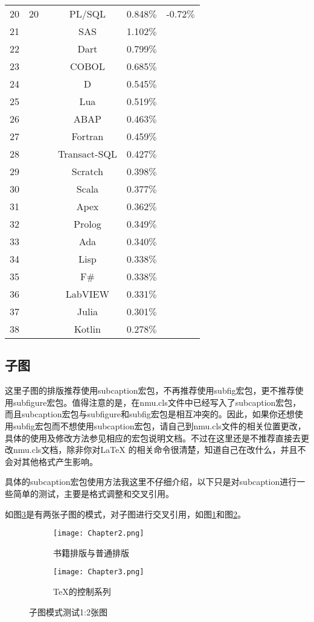 \begin{longtabu}{cccccc}
	20	&	20	&		&	PL/SQL	&	0.848$\%$	&	-0.72$\%$	\\
	21	&		&		&	SAS	&	1.102$\%$	&		\\
	22	&		&		&	Dart	&	0.799$\%$	&		\\
	23	&		&		&	COBOL	&	0.685$\%$	&		\\
	24	&		&		&	D	&	0.545$\%$	&		\\
	25	&		&		&	Lua	&	0.519$\%$	&		\\
	26	&		&		&	ABAP	&	0.463$\%$	&		\\
	27	&		&		&	Fortran	&	0.459$\%$	&		\\
	28	&		&		&	Transact-SQL	&	0.427$\%$	&		\\
	29	&		&		&	Scratch	&	0.398$\%$	&		\\
	30	&		&		&	Scala	&	0.377$\%$	&		\\
	31	&		&		&	Apex	&	0.362$\%$	&		\\
	32	&		&		&	Prolog	&	0.349$\%$	&		\\
	33	&		&		&	Ada	&	0.340$\%$	&		\\
	34	&		&		&	Lisp	&	0.338$\%$	&		\\
	35	&		&		&	F$\#$	&	0.338$\%$	&		\\
	36	&		&		&	LabVIEW	&	0.331$\%$	&		\\
	37	&		&		&	Julia	&	0.301$\%$	&		\\
	38	&		&		&	Kotlin	&	0.278$\%$	&		\\	
\end{longtabu}%

\subsection{子图}
这里子图的排版推荐使用subcaption宏包，不再推荐使用subfig宏包，更不推荐使用subfigure宏包。值得注意的是，在nmu.cls文件中已经写入了subcaption宏包，而且subcaption宏包与subfigure和subfig宏包是相互冲突的。因此，如果你还想使用subfig宏包而不想使用subcaption宏包，请自己到nmu.cls文件的相关位置更改，具体的使用及修改方法参见相应的宏包说明文档。不过在这里还是不推荐直接去更改nmu.cls文档，除非你对\LaTeX{} 的相关命令很清楚，知道自己在改什么，并且不会对其他格式产生影响。

具体的subcaption宏包使用方法我这里不仔细介绍，以下只是对subcaption进行一些简单的测试，主要是格式调整和交叉引用。

如图\ref{fig:subfig_test1}是有两张子图的模式，对子图进行交叉引用，如图\ref{subfig:1a}和图\ref{subfig:1b}。

\begin{figure}[htbp]
	\centering
	\begin{subfigure}[b]{.4\textwidth}
		\centering
		\texttt{[image: Chapter2.png]}
		\caption{书籍排版与普通排版}\label{subfig:1a}
	\end{subfigure}
	\quad
	\begin{subfigure}[b]{.4\textwidth}
		\centering
		\texttt{[image: Chapter3.png]}
		\caption{\TeX 的控制系列}\label{subfig:1b}
	\end{subfigure}
	\caption{子图模式测试1:2张图}\label{fig:subfig_test1}
\end{figure}

